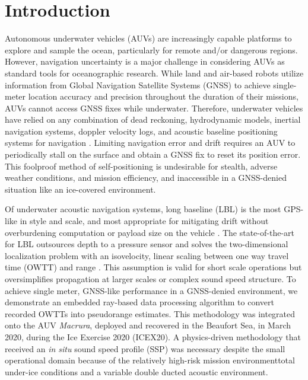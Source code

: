
\maketitle


\section{Introduction}
\label{sec:1}  
Autonomous underwater vehicles (AUVs) are increasingly capable platforms to explore and sample the ocean, particularly for remote and/or dangerous regions.
However, navigation uncertainty is a major challenge in considering AUVs as standard tools for oceanographic research.
While land and air-based robots utilize information from Global Navigation Satellite Systems (GNSS) to achieve single-meter location accuracy and precision throughout the duration of their missions, AUVs cannot access GNSS fixes while underwater.
Therefore, underwater vehicles have relied on any combination of dead reckoning, hydrodynamic models, inertial navigation systems, doppler velocity logs, and acoustic baseline positioning systems for navigation \citep{paull_auv_2014}.
Limiting navigation error and drift requires an AUV to periodically stall on the surface and obtain a GNSS fix to reset its position error.
This foolproof method of self-positioning is undesirable for stealth, adverse weather conditions, and mission efficiency, and inaccessible in a GNSS-denied situation like an ice-covered environment.

Of underwater acoustic navigation systems, long baseline (LBL) is the most GPS-like in style and scale, and most appropriate for mitigating drift without overburdening computation or payload size on the vehicle \citep{van_uffelen_global_2021}.
The state-of-the-art for LBL outsources depth to a pressure sensor and solves the two-dimensional localization problem with an isovelocity, linear scaling between one way travel time (OWTT) and range \citep{Eustice2006,Eustice2007,webster_advances_2012,Webster2009}.
This assumption is valid for short scale operations but oversimplifies propagation at larger scales or complex sound speed structure.
To achieve single meter, GNSS-like performance in a GNSS-denied environment, we demonstrate an embedded ray-based data processing algorithm to convert recorded OWTTs into pseudorange estimates.
This methodology was integrated onto the AUV \emph{Macrura}, deployed and recovered in the Beaufort Sea, in March 2020, during the Ice Exercise 2020 (ICEX20).
A physics-driven methodology that received an \textit{in situ} sound speed profile (SSP) was necessary despite the small operational domain because of the relatively high-risk mission environment\textemdash total under-ice conditions and a variable double ducted acoustic environment.

